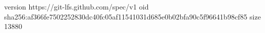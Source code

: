 version https://git-lfs.github.com/spec/v1
oid sha256:af366fe7502252830dc40fc05af11541031d685e0b02bfa90c5f96641b98cf85
size 13880
